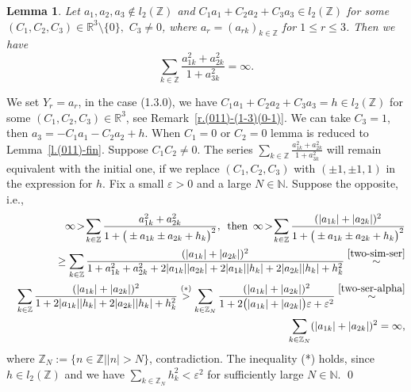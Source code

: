 \documentclass[preprint,12pt]{elsarticle}
\newtheorem{lem}[thm]{Lemma}
\numberwithin{equation}{section}
\begin{document}
\begin{lem}
\label{l.(011)-fin.3}
Let  $a_1,a_2,a_3\not\in l_2(\mathbb Z)$
and 
$C_1a_1+C_2a_2+C_3a_3\in l_2(\mathbb Z)$ for some $(C_1,C_2,C_3)\in \mathbb R^3\setminus\{0\},\,\,C_3\not=0$, where 
$a_r=(a_{rk})_{k\in \mathbb Z}$ for $1\leq r \leq 3$.  
Then we have 
\begin{equation}
\label{(011)-fin.3} 
\sum_{k\in \mathbb Z}\frac{a^2_{1k}+a^2_{2k}}{
1+a_{3k}^2}=\infty.
\end{equation}
\end{lem}
%
\begin{pf}
We set $Y_r=a_r$,
in the case (1.3.0), we have $C_1a_1+C_2a_2+C_3a_3=h\in l_2(\mathbb Z)$ for some $(C_1,C_2,C_3)\in \mathbb R^3$, see Remark~\ref{r.(011)-(1-3)(0-1)}. We can take $C_3=1$, then $a_3=-C_1a_1-C_2a_2+h$. 
When $C_1=0$ or $C_2=0$ lemma is reduced to Lemma~\ref{l.(011)-fin}.
Suppose $C_1C_2\not=0$.
The series  $\sum_{k\in \mathbb Z}\frac{a^2_{1k}+a^2_{2k}}{
1+a_{3k}^2}$ will remain equivalent  with the initial one, if we replace
$(C_1,C_2,C_3)$ with $(\pm 1,\pm 1,1)$ in the expression for $h$.
Fix a small $\varepsilon>0$ and a large $N
\in \mathbb N$. Suppose the opposite, i.e.,
\begin{eqnarray*}
&& 
\infty\!>\!
\sum_{k\in \mathbb Z}\frac{a^2_{1k}+ a^2_{2k}}{
1+\big(\pm a_{1k}\pm a_{2k}+h_k\big)^2},\,\,\,
\text{then}
\,\,\,
\infty\!>\!\sum_{k\in \mathbb Z}\frac{(\vert a_{1k}\vert+\vert a_{2k}\vert)^2}{
1+\big(\pm a_{1k}\pm a_{2k}+h_k\big)^2}
\\
%
&&
\geq\sum_{k\in \mathbb Z}\frac{(\vert a_{1k}\vert+\vert a_{2k}\vert)^2}{
1+a^2_{1k}+a^2_{2k}+2\vert a_{1k}\vert \vert a_{2k}\vert+2\vert a_{1k}\vert \vert h_k\vert +2\vert a_{2k}\vert \vert h_k\vert +h^2_k}\stackrel{\eqref{two-sim-ser}}{\sim}\\
%
&&\sum_{k\in \mathbb Z}\frac{
(\vert a_{1k}\vert+\vert a_{2k}\vert)^2}{
1+
2\vert a_{1k}\vert \vert h_k\vert +2\vert a_{2k}\vert \vert h_k\vert +h^2_k
}\stackrel{(*)}{>}
\sum_{k\in \mathbb Z_N}\frac{
(\vert a_{1k}\vert+\vert a_{2k}\vert)^2
}{
1+2\big(\vert a_{1k}\vert +
\vert a_{2k}\vert\big) \varepsilon+
\varepsilon^2}\stackrel{\eqref{two-ser-alpha} }{\sim}\\
&&
\sum_{k\in \mathbb Z_N}
(\vert a_{1k}\vert+\vert a_{2k}\vert)^2=\infty,
\end{eqnarray*}
where $\mathbb Z_N:=\{n\in \mathbb Z\mid \vert n\vert>N\}$, contradiction. The inequality (*) holds,
since $h\in l_2(\mathbb Z)$ and  we have $\sum_{k\in \mathbb Z_N}h^2_k<\varepsilon^2$
for sufficiently large $N\in \mathbb N$.
\qed\end{pf}
%
\end{document}
